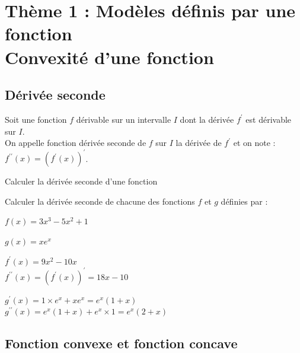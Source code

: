 \chapter[Thème 1 $-$ Convexité]{Thème 1 : Modèles définis par une fonction \\Convexité d'une fonction}
\thispagestyle{fancy}

\vspace*{-0.6cm}
\section{Dérivée seconde}

\begin{bdefi}
	Soit une fonction \(f\) dérivable sur un intervalle \(I\) dont la dérivée \(f^{\prime}\) est dérivable sur \(I\).\\
	On appelle fonction dérivée seconde de \(f\) sur \(I\) la dérivée de \(f^{\prime}\) et on note :\\
	\(f^{\prime \prime}(x)=\left(f^{\prime}(x)\right)^{\prime}\).
\end{bdefi}

\vspace*{-0.3cm}
\begin{bmethodet}{Calculer la dérivée seconde d'une fonction}
	
	Calculer la dérivée seconde de chacune des fonctions \(f\) et \(g\) définies par :
	\begin{enumMet}
		\item \(f(x)=3 x^{3}-5 x^{2}+1\)
		\item \(g(x)=x e^{x}\)
	\end{enumMet}
	
	
	\begin{enumMet}
		\item \(f^{\prime}(x)=9 x^{2}-10 x\)\\
		\(f^{\prime \prime}(x)=\left(f^{\prime}(x)\right)^{\prime}=18 x-10\)
		\item \(g^{\prime}(x)=1 \times e^{x}+x e^{x}=e^{x}(1+x)\)\\
		\(g^{\prime \prime}(x)=e^{x}(1+x)+e^{x} \times 1=e^{x}(2+x)\)
	\end{enumMet}
\end{bmethodet}

\vspace*{-0.9cm}
\section{Fonction convexe et fonction concave}

